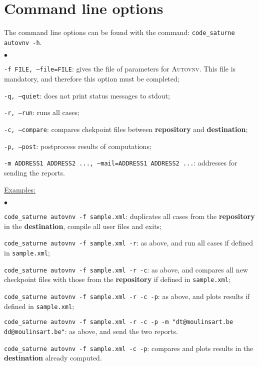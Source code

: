 \documentclass[a4paper,10pt,twoside]{article}
\begin{document}
\section{Command line options}

The command line options can be found with the command: \texttt{code\_saturne
autovnv -h}.

\begin{list}{$\bullet$}{}
\item \texttt{-f FILE, --file=FILE}: gives the file of parameters for
\textsc{Autovnv}. This file is mandatory, and therefore this option must be
completed;
\item \texttt{-q, --quiet}: does not print status messages to stdout;
\item \texttt{-r, --run}: runs all cases;
\item \texttt{-c, --compare}: compares chekpoint files between
\textbf{repository} and \textbf{destination};
\item \texttt{-p, --post}: postprocess results of computations;
\item \texttt{-m ADDRESS1 ADDRESS2 ..., --mail=ADDRESS1 ADDRESS2 ...}: addresses
for sending the reports.
\end{list}

\underline{Examples:}

\begin{list}{$\bullet$}{}
\item \texttt{code\_saturne autovnv -f sample.xml}: duplicates all cases from
the \textbf{repository} in the \textbf{destination}, compile all user files
and exits;
\item \texttt{code\_saturne autovnv -f sample.xml -r}: as above, and run all
cases if defined in \texttt{sample.xml};
\item \texttt{code\_saturne autovnv -f sample.xml -r -c}: as above, and compares
all new checkpoint files with those from the \textbf{repository} if defined
in \texttt{sample.xml};
\item \texttt{code\_saturne autovnv -f sample.xml -r -c -p}: as above, and plots
results if defined in \texttt{sample.xml};
\item \texttt{code\_saturne autovnv -f sample.xml -r -c -p -m
"dt@moulinsart.be dd@moulinsart.be"}: as above, and send the two
reports.
\item \texttt{code\_saturne autovnv -f sample.xml -c -p}: compares and plots
results in the \textbf{destination} already computed.
\end{list}
\end{document}
